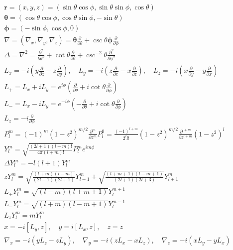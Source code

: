 \documentclass{amsart}
\begin{document}
\begin{gather}
\boldsymbol r  = (x,y,z) = (\sin\theta \cos\phi,\sin\theta\sin\phi,\cos\theta) \\
\boldsymbol\theta = (\cos\theta\cos\phi,\cos\theta\sin\phi,-\sin\theta) \\
\boldsymbol\phi = (-\sin\phi,\cos\phi,0) \\
\nabla = (\nabla_x,\nabla_y,\nabla_z) = \boldsymbol \theta \frac{\partial}{\partial\theta} + \csc\theta\boldsymbol\phi \frac{\partial}{\partial\phi} \\
\Delta = \nabla^2 = \frac{\partial^2}{\partial\theta^2} + \cot\theta\frac\partial{\partial\theta} + \csc^{-2}\theta\frac{\partial^2}{\partial\phi^2} \\
L_x = -i\left(y\frac\partial{\partial z} - z\frac\partial{\partial y}\right) ,\quad
L_y = -i\left(z\frac\partial{\partial x} - x\frac\partial{\partial z}\right) ,\quad
L_z = -i\left(x\frac\partial{\partial y} - y\frac\partial{\partial x}\right) \\
L_+ = L_x + i L_y = e^{i\phi} \left(\frac\partial{\partial\theta} + i\cot\theta\frac\partial{\partial\phi}\right) \\
L_- = L_x - i L_y = e^{-i\phi}\left(-\frac\partial{\partial\theta} + i\cot\theta\frac\partial{\partial\phi}\right) \\
L_z = -i \frac\partial{\partial\phi} \\
P_l^m = (-1)^m(1-z^2)^{m/2}\frac{\partial^m}{\partial z^m}P_l^0 = \frac{(-1)^{l+m}}{2^l l!} (1-z^2)^{m/2} \frac{\partial^{l+m}}{\partial z^{l+m}}(1-z^2)^l \\
Y_l^m = \sqrt{\frac{(2l+1)(l-m)!}{4\pi(l+m)!}} P_l^m e^{im\phi} \\
\Delta Y_l^m = -l(l+1)Y_l^m \\
zY_l^m = \sqrt{\frac{(l+m)(l-m)}{(2l-1)(2l+1)}} Y_{l-1}^m + \sqrt{\frac{(l+m+1)(l-m+1)}{(2l+1)(2l+3)}} Y_{l+1}^m \\
L_+Y_l^m = \sqrt{(l-m)(l+m+1)}Y_l^{m+1} \\
L_-Y_l^m = \sqrt{(l+m)(l-m+1)}Y_l^{m-1} \\
L_z Y_l^m = mY_l^m \\
x = -i[L_y,z] ,\quad
y = i[L_x,z] ,\quad
z = z \\
\nabla_x = -i(y L_z - z L_y) ,\quad
\nabla_y = -i(z L_x - x L_z) ,\quad
\nabla_z = -i(x L_y - y L_x)
\end{gather}
\end{document}
